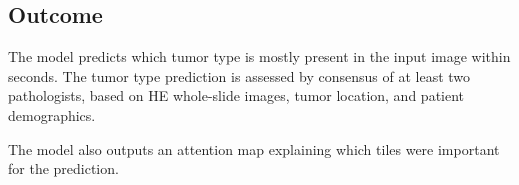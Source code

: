 \subsection{Outcome}

The model predicts which tumor type is mostly present in the input image within seconds.
The tumor type prediction is assessed by consensus of at least two pathologists, based on HE whole-slide images, tumor location, and patient demographics.

The model also outputs an attention map explaining which tiles were important for the prediction.
